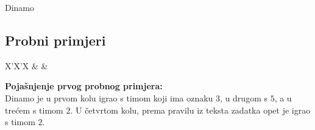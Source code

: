 \begin{statement}[
  problempoints=20,
  timelimit=1 sekunda,
  memorylimit=512 MiB,
]{Dinamo}
\subsection*{Probni primjeri}
\begin{tabularx}{\textwidth}{X'X'X}
 &
 &
\end{tabularx}

\textbf{Pojašnjenje prvog probnog primjera:} \\
Dinamo je u prvom kolu igrao s timom koji ima oznaku $3$, u drugom s $5$, a u
trećem s timom $2$. U četvrtom kolu, prema pravilu iz teksta zadatka opet
je igrao s timom $2$.

\end{statement}

